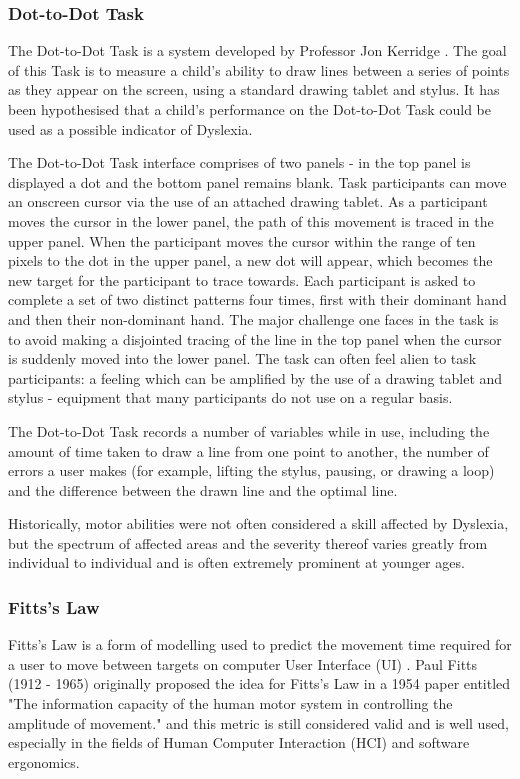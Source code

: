 		\subsubsection{Dot-to-Dot Task}
			The Dot-to-Dot Task is a system developed by Professor Jon Kerridge \cite{Willis2010, Piotrowska2015}. The goal of this Task is to measure a child’s ability to draw lines between a series of points as they appear on the screen, using a standard drawing tablet and stylus. It has been hypothesised that a child's performance on the Dot-to-Dot Task could be used as a possible indicator of Dyslexia.
	
			The Dot-to-Dot Task interface comprises of two panels - in the top panel is displayed a dot and the bottom panel remains blank. Task participants can move an onscreen cursor via the use of an attached drawing tablet. As a participant moves the cursor in the lower panel, the path of this movement is traced in the upper panel. When the participant moves the cursor within the range of ten pixels to the dot in the upper panel, a new dot will appear, which becomes the new target for the participant to trace towards. Each participant is asked to complete a set of two distinct patterns four times, first with their dominant hand and then their non-dominant hand. The major challenge one faces in the task is to avoid making a disjointed tracing of the line in the top panel when the cursor is suddenly moved into the lower panel. The task can often feel alien to task participants: a feeling which can be amplified by the use of a drawing tablet and stylus - equipment that many participants do not use on a regular basis.
	
			The Dot-to-Dot Task records a number of variables while in use, including the amount of time taken to draw a line from one point to another, the number of errors a user makes (for example, lifting the stylus, pausing, or drawing a loop) and the difference between the drawn line and the optimal line.
	
			Historically, motor abilities were not often considered a skill affected by Dyslexia, but the spectrum of affected areas and the severity thereof varies greatly from individual to individual and is often extremely prominent at younger ages.
		
		\subsubsection{Fitts's Law}
			Fitts’s Law is a form of modelling used to predict the movement time required for a user to move between targets on computer User Interface (UI) \cite{MacKenzie1992, MacKenzie1995}. Paul Fitts (1912 - 1965) originally proposed the idea for Fitts’s Law in a 1954 paper entitled "The information capacity of the human motor system in controlling the amplitude of movement." \cite{Fitts1954} and this metric is still considered valid and is well used, especially in the fields of Human Computer Interaction (HCI) and software ergonomics.

